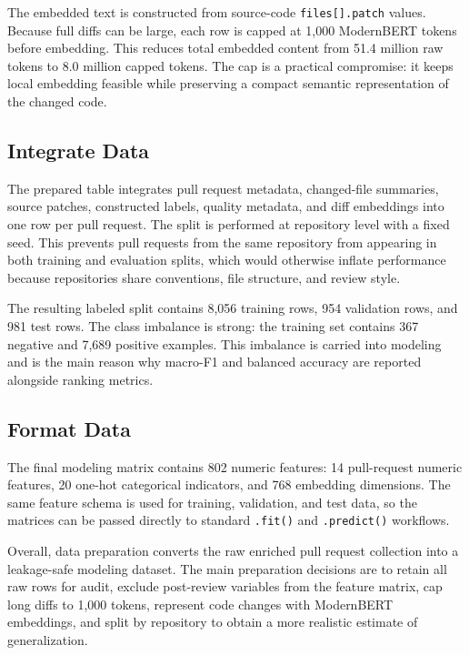 The embedded text is constructed from source-code \texttt{files[].patch} values. Because full diffs can be large, each row is capped at 1,000 ModernBERT tokens before embedding. This reduces total embedded content from 51.4 million raw tokens to 8.0 million capped tokens. The cap is a practical compromise: it keeps local embedding feasible while preserving a compact semantic representation of the changed code.

\subsection{Integrate Data}

The prepared table integrates pull request metadata, changed-file summaries, source patches, constructed labels, quality metadata, and diff embeddings into one row per pull request. The split is performed at repository level with a fixed seed. This prevents pull requests from the same repository from appearing in both training and evaluation splits, which would otherwise inflate performance because repositories share conventions, file structure, and review style.

The resulting labeled split contains 8,056 training rows, 954 validation rows, and 981 test rows. The class imbalance is strong: the training set contains 367 negative and 7,689 positive examples. This imbalance is carried into modeling and is the main reason why macro-F1 and balanced accuracy are reported alongside ranking metrics.

\subsection{Format Data}

The final modeling matrix contains 802 numeric features: 14 pull-request numeric features, 20 one-hot categorical indicators, and 768 embedding dimensions. The same feature schema is used for training, validation, and test data, so the matrices can be passed directly to standard \texttt{.fit()} and \texttt{.predict()} workflows.

Overall, data preparation converts the raw enriched pull request collection into a leakage-safe modeling dataset. The main preparation decisions are to retain all raw rows for audit, exclude post-review variables from the feature matrix, cap long diffs to 1,000 tokens, represent code changes with ModernBERT embeddings, and split by repository to obtain a more realistic estimate of generalization.
